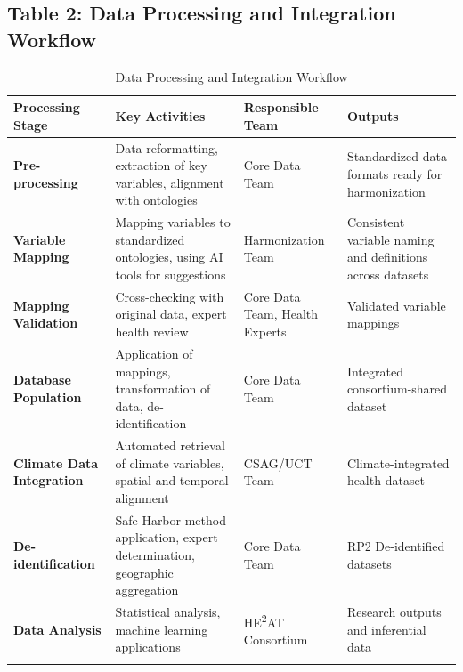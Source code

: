 \graphicspath{{./}{./sections/images/}{./images/}}\documentclass[12pt,a4paper,landscape]{article}
\begin{document}
\subsection*{Table 2: Data Processing and Integration Workflow}
\begin{longtable}{L{4cm}L{7cm}L{4cm}L{4.5cm}}
\toprule
\textbf{Processing Stage} & \textbf{Key Activities} & \textbf{Responsible Team} & \textbf{Outputs} \\
\midrule
\endhead

\textbf{Pre-processing} 
& Data reformatting, extraction of key variables, alignment with ontologies 
& Core Data Team 
& Standardized data formats ready for harmonization \\
\midrule

\textbf{Variable Mapping} 
& Mapping variables to standardized ontologies, using AI tools for suggestions 
& Harmonization Team 
& Consistent variable naming and definitions across datasets \\
\midrule

\textbf{Mapping Validation} 
& Cross-checking with original data, expert health review 
& Core Data Team, Health Experts 
& Validated variable mappings \\
\midrule

\textbf{Database Population} 
& Application of mappings, transformation of data, de-identification 
& Core Data Team 
& Integrated consortium-shared dataset \\
\midrule

\textbf{Climate Data Integration} 
& Automated retrieval of climate variables, spatial and temporal alignment 
& CSAG/UCT Team 
& Climate-integrated health dataset \\
\midrule

\textbf{De-identification} 
& Safe Harbor method application, expert determination, geographic aggregation 
& Core Data Team 
& RP2 De-identified datasets \\
\midrule

\textbf{Data Analysis} 
& Statistical analysis, machine learning applications 
& HE\textsuperscript{2}AT Consortium 
& Research outputs and inferential data \\
\bottomrule
\caption{Data Processing and Integration Workflow}
\end{longtable}
\clearpage

\end{document}
